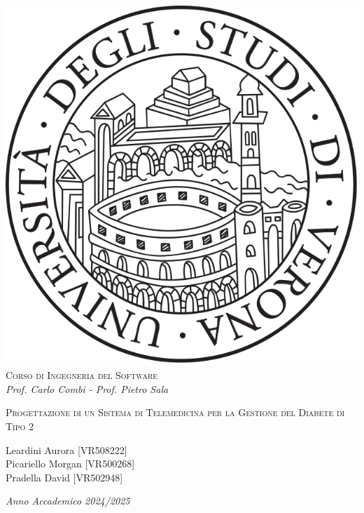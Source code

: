 \begin{titlepage}
\begin{center}
\begin{spacing}{1.5}
\includegraphics[width=.2\textwidth, height=.2\textheight, keepaspectratio]{figures/verona.png}\\
{{\Large{\textsc{Corso di Ingegneria del Software}}}}\\
{\large{\it Prof. Carlo Combi - Prof. Pietro Sala}}
\end{spacing}
\end{center}
\vspace{15mm}
\begin{center}
\begin{spacing}{1.5}
    
{\large }

{\LARGE{\textsc{Progettazione di un Sistema di Telemedicina per la Gestione del Diabete di Tipo 2}}}\\
\begin{center}
\vspace{35mm}
{\large{\textsc Leardini Aurora [VR508222] \\Picariello Morgan [VR500268] \\Pradella David [VR502948]}}
\end{center}
\end{spacing}
\end{center}
\par
\noindent
\vspace{45mm}
\begin{center}
{\large{\it Anno Accademico 2024/2025 }}
\end{center}
\end{titlepage}